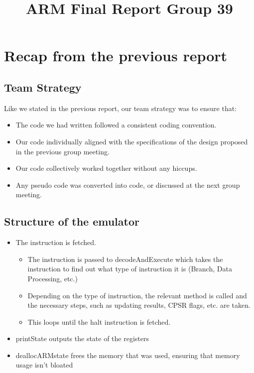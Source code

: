 \documentclass[11pt]{article}
\begin{document}
\title{ARM Final Report Group 39}

\maketitle

\section{Recap from the previous report}

\subsection{Team Strategy}

Like we stated in the previous report, our team strategy was to ensure that:

\begin{itemize}

    \item The code we had written followed a consistent coding convention.
    \item Our code individually aligned with the specifications of the design proposed in the previous group meeting.
    \item Our code collectively worked together without any hiccups.
    \item Any pseudo code was converted into code, or discussed at the next group meeting.

\end{itemize}

\subsection{Structure of the emulator}

\begin{itemize}

    \item The instruction is fetched.
    
    \begin{itemize}
    
        \item The instruction is passed to decodeAndExecute which  takes the instruction to find out what type of instruction it is (Branch, Data Processing, etc.)
        \item Depending on the type of instruction, the relevant method is called and the necessary steps, such as updating results, CPSR flags, etc. are taken.
        \item This loops until the halt instruction is fetched.

    \end{itemize}
  
    \item printState outputs the state of the registers
    \item deallocARMstate frees the memory that was used, ensuring that memory usage isn't bloated

\end{itemize}
\end{document}
